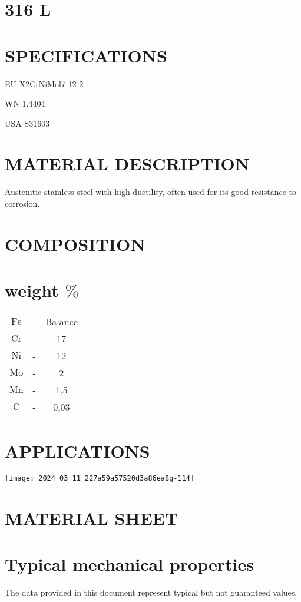 \documentclass[10pt]{article}
\begin{document}
\section*{316 L}
\section*{SPECIFICATIONS}
EU X2CrNiMol7-12-2

WN 1.4404

USA S31603

\section*{MATERIAL DESCRIPTION}
Austenitic stainless steel with high ductility, often used for its good resistance to corrosion.

\section*{COMPOSITION}
\section*{weight $\%$}
\begin{center}
\begin{tabular}{ccc}
$\mathrm{Fe}$ & - & Balance \\
$\mathrm{Cr}$ & - & 17 \\
$\mathrm{Ni}$ & - & 12 \\
$\mathrm{Mo}$ & - & 2 \\
$\mathrm{Mn}$ & - & 1,5 \\
$\mathrm{C}$ & - & 0,03 \\
\end{tabular}
\end{center}

\section*{APPLICATIONS}
\begin{center}
\texttt{[image: 2024\_03\_11\_227a59a57520d3a86ea8g-114]}
\end{center}

\section*{MATERIAL SHEET}
\section*{Typical mechanical properties}
The data provided in this document represent typical but not guaranteed values.
\end{document}

